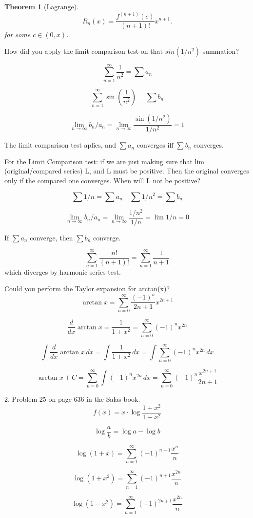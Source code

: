 \documentclass{article}
\newtheorem*{theorem}{Theorem}
\theoremstyle{definition}
\begin{document}
\begin{theorem}[Lagrange]
$$  R_n(x) = \frac{f^{(n+1)}(c)}{(n+1)!} x^{n+1}.$$
for some $c \in (0,x)$.
\end{theorem}

How did you apply the limit comparison test on that $sin(1/n^2)$
summation?

$$
\sum_{n=1}^\infty \frac{1}{n^2} = \sum a_n
$$

$$
\sum_{n=1}^\infty \sin\left(\frac{1}{n^2}\right) = \sum b_n
$$

$$
\lim_{n \to \infty} b_n/a_n = \lim_{n \to \infty} \frac{\sin(1/n^2)}{1/n^2} = 1
$$

The limit comparison test aplies, and $\sum a_n$ converges iff $\sum
b_n$ converges.

For the Limit Comparison test: if we are just making sure that lim
(original/compared series) L, and L must be positive. Then the original
converges only if the compared one converges. When will L not be positive?

$$
\sum 1/n = \sum a_n \hspace{1em} \sum 1/n^2 = \sum b_n
$$

$$
\lim_{n \to \infty} b_n/a_n = \lim_{n \to \infty} \frac{1/n^2}{1/n} = \lim 1/n = 0
$$

If $\sum a_n$ converge, then $\sum b_n$ converge.

$$
\sum_{n=1}^\infty \frac{n!}{(n+1)!} = \sum_{n=1}^\infty \frac{1}{n+1}
$$
which diverges by harmonic series test.

Could you perform the Taylor expansion for arctan(x)?
$$
\arctan x = \sum^{\infty}_{n=0} \frac{(-1)^n}{2n+1} x^{2n+1}
$$

$$
\frac{d}{dx} \arctan x = \frac{1}{1+x^2} = \sum_{n=0}^\infty (-1)^n x^{2n}
$$

$$
\int \frac{d}{dx} \arctan x \, dx = \int \frac{1}{1+x^2} \, dx = \int \sum_{n=0}^\infty (-1)^n x^{2n} \, dx
$$

$$
\arctan x + C = \sum_{n=0}^\infty \int (-1)^n x^{2n} \, dx = \sum_{n=0}^\infty (-1)^n \frac{x^{2n+1}}{2n+1} 
$$

2. Problem 25 on page 636 in the Salas book.
$$
f(x) = x \cdot \log \frac{1+x^2}{1-x^2}
$$

$$
\log \frac{a}{b} = \log a - \log b
$$

$$
\log(1+x) =  \sum^{\infty}_{n=1} (-1)^{n+1}\frac{x^n}n
$$

$$
\log(1+x^2) =  \sum^{\infty}_{n=1} (-1)^{n+1}\frac{x^{2n}}n
$$

$$
\log(1-x^2) = \sum^{\infty}_{n=1} (-1)^{2n+1} \frac{x^{2n}}n
$$
\end{document}
